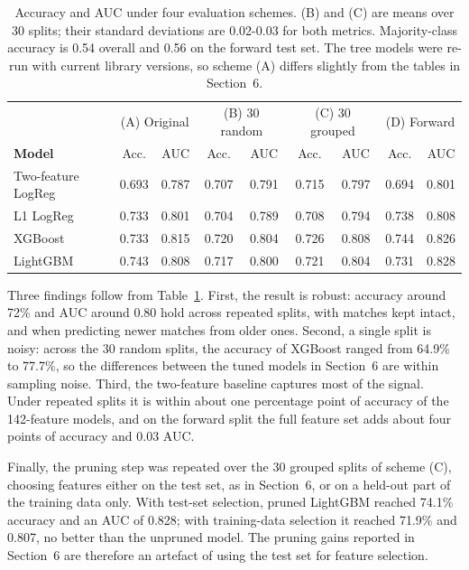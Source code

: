 \documentclass[11pt]{article}
\begin{document}
\begin{table}[H]
\centering
\small
\begin{tabular}{lcccccccc}
\hline
 & \multicolumn{2}{c}{(A) Original} & \multicolumn{2}{c}{(B) 30 random} & \multicolumn{2}{c}{(C) 30 grouped} & \multicolumn{2}{c}{(D) Forward} \\
\textbf{Model} & Acc. & AUC & Acc. & AUC & Acc. & AUC & Acc. & AUC \\
\hline
Two-feature LogReg & 0.693 & 0.787 & 0.707 & 0.791 & 0.715 & 0.797 & 0.694 & 0.801 \\
L1 LogReg          & 0.733 & 0.801 & 0.704 & 0.789 & 0.708 & 0.794 & 0.738 & 0.808 \\
XGBoost            & 0.733 & 0.815 & 0.720 & 0.804 & 0.726 & 0.808 & 0.744 & 0.826 \\
LightGBM           & 0.743 & 0.808 & 0.717 & 0.800 & 0.721 & 0.804 & 0.731 & 0.828 \\
\hline
\end{tabular}
\caption{Accuracy and AUC under four evaluation schemes. (B) and (C) are means over 30 splits; their standard deviations are 0.02-0.03 for both metrics. Majority-class accuracy is 0.54 overall and 0.56 on the forward test set. The tree models were re-run with current library versions, so scheme (A) differs slightly from the tables in Section~6.}
\label{tab:robustness}
\end{table}

Three findings follow from Table~\ref{tab:robustness}. First, the result is robust: accuracy around 72\% and AUC around 0.80 hold across repeated splits, with matches kept intact, and when predicting newer matches from older ones. Second, a single split is noisy: across the 30 random splits, the accuracy of XGBoost ranged from 64.9\% to 77.7\%, so the differences between the tuned models in Section~6 are within sampling noise. Third, the two-feature baseline captures most of the signal. Under repeated splits it is within about one percentage point of accuracy of the 142-feature models, and on the forward split the full feature set adds about four points of accuracy and 0.03 AUC.

Finally, the pruning step was repeated over the 30 grouped splits of scheme (C), choosing features either on the test set, as in Section~6, or on a held-out part of the training data only. With test-set selection, pruned LightGBM reached 74.1\% accuracy and an AUC of 0.828; with training-data selection it reached 71.9\% and 0.807, no better than the unpruned model. The pruning gains reported in Section~6 are therefore an artefact of using the test set for feature selection.
\end{document}
